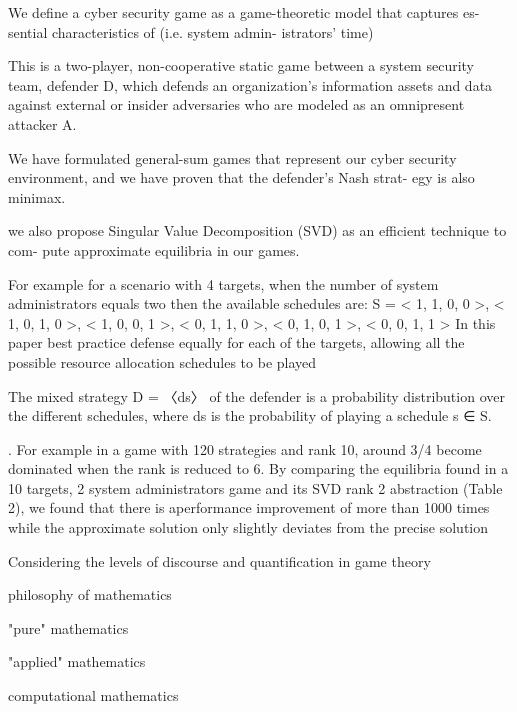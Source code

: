 

We define a cyber security game as a game-theoretic model that captures es-
sential characteristics of %
(i.e. system admin-
istrators’ time) 





This is a two-player, non-cooperative static game between a
system security team, defender D, which defends an organization’s information
assets and data against external or insider adversaries who are modeled as an
omnipresent attacker A. %


We have formulated general-sum games that represent our cyber
security environment, and we have proven that the defender’s Nash strat-
egy is also minimax.


we also propose
Singular Value Decomposition (SVD) as an efficient technique to com-
pute approximate equilibria in our games. 



For example for a
scenario with 4 targets, when the number of system administrators equals two
then the available schedules are:
S = {< 1, 1, 0, 0 >, < 1, 0, 1, 0 >, < 1, 0, 0, 1 >,
< 0, 1, 1, 0 >, < 0, 1, 0, 1 >, < 0, 0, 1, 1 >}
In this paper %
best practice defense equally for each of the targets, allowing all the possible
resource allocation schedules to be played


The mixed strategy D = 〈ds〉 of the
defender is a probability distribution over the different schedules, where ds is
the probability of playing a schedule s ∈ S.


. For example in a game with 120 strategies and rank 10,
around 3/4 become dominated when the rank is reduced to 6. By comparing
the equilibria found in a 10 targets, 2 system administrators game and its SVD
rank 2 abstraction (Table 2), we found that there is aperformance improvement
of more than 1000 times while the approximate solution only slightly deviates
from the precise solution

Considering the levels of discourse and quantification in game theory

philosophy of mathematics

"pure" mathematics

"applied" mathematics

computational mathematics

 


